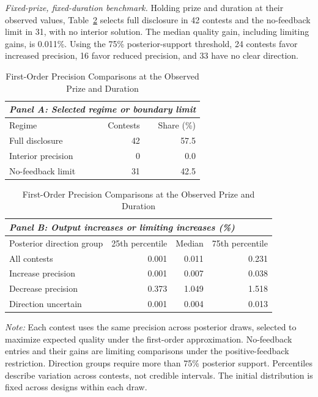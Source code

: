 \textit{Fixed-prize, fixed-duration benchmark.} Holding prize and duration at their observed values, Table~\ref{tab-fixed-precision} selects full disclosure in 42 contests and the no-feedback limit in 31, with no interior solution. The median quality gain, including limiting gains, is 0.011\%. Using the 75\% posterior-support threshold, 24 contests favor increased precision, 16 favor reduced precision, and 33 have no clear direction.

\begin{table}[!htbp]
\centering
\caption{First-Order Precision Comparisons at the Observed Prize and Duration}
\label{tab-fixed-precision}
{\small
\begin{tabularx}{\textwidth}{Xrr}
\multicolumn{3}{l}{\textit{Panel A: Selected regime or boundary limit}}\\
\midrule
Regime & Contests & Share (\%)\\
\midrule
Full disclosure & 42 & 57.5 \\
Interior precision & 0 & 0.0 \\
No-feedback limit & 31 & 42.5 \\
\bottomrule
\end{tabularx}
\vspace{2ex}
\begin{tabularx}{\textwidth}{Xrrr}
\multicolumn{4}{l}{\textit{Panel B: Output increases or limiting increases (\%)}}\\
\midrule
Posterior direction group & 25th percentile & Median & 75th percentile\\
\midrule
All contests & 0.001 & 0.011 & 0.231\\
Increase precision & 0.001 & 0.007 & 0.038\\
Decrease precision & 0.373 & 1.049 & 1.518\\
Direction uncertain & 0.001 & 0.004 & 0.013\\
\bottomrule
\end{tabularx}}
\begin{minipage}{\textwidth}
\footnotesize\textit{Note:} Each contest uses the same precision across posterior draws, selected to maximize expected quality under the first-order approximation. No-feedback entries and their gains are limiting comparisons under the positive-feedback restriction. Direction groups require more than 75\% posterior support. Percentiles describe variation across contests, not credible intervals. The initial distribution is fixed across designs within each draw.
\end{minipage}
\end{table}

